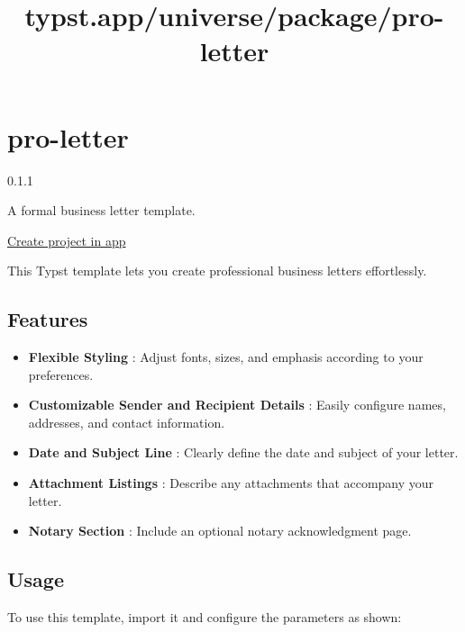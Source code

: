 \title{typst.app/universe/package/pro-letter}

\label{banner}
\label{template-thumbnail}

\section{pro-letter}\label{pro-letter}

{ 0.1.1 }

A formal business letter template.

\href{/app?template=pro-letter&version=0.1.1}{Create project in app}

\label{readme}
This Typst template lets you create professional business letters
effortlessly.

\subsection{Features}\label{features}

\begin{itemize}
\tightlist
\item
  \textbf{Flexible Styling} : Adjust fonts, sizes, and emphasis
  according to your preferences.
\item
  \textbf{Customizable Sender and Recipient Details} : Easily configure
  names, addresses, and contact information.
\item
  \textbf{Date and Subject Line} : Clearly define the date and subject
  of your letter.
\item
  \textbf{Attachment Listings} : Describe any attachments that accompany
  your letter.
\item
  \textbf{Notary Section} : Include an optional notary acknowledgment
  page.
\end{itemize}

\subsection{Usage}\label{usage}

To use this template, import it and configure the parameters as shown:

